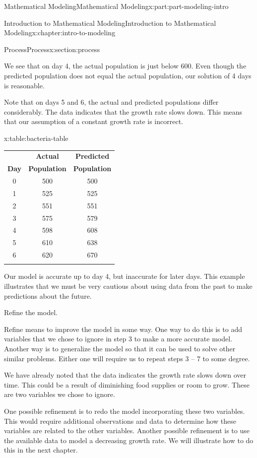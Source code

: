 \documentclass[oneside,10pt,]{book}
\newcommand{\tabularfont}{\relax}
\numberwithin{equation}{section}
\newcommand{\hrulethin}  {\noalign{\hrule height 0.04em}}
\newcommand{\hrulethick} {\noalign{\hrule height 0.11em}}
\begin{document}
\begin{partptx}{Mathematical Modeling}{}{Mathematical Modeling}{}{}{x:part:part-modeling-intro}
\begin{chapterptx}{Introduction to Mathematical Modeling}{}{Introduction to Mathematical Modeling}{}{}{x:chapter:intro-to-modeling}
\begin{sectionptx}{Process}{}{Process}{}{}{x:section:process}
\begin{description}
\par
We see that on day 4, the actual population is just below 600. Even though the predicted population does not equal the actual population, our solution of 4 days is reasonable.%
\par
Note that on days 5 and 6, the actual and predicted populations differ considerably. The data indicates that the growth rate slows down. This means that our assumption of a constant growth rate is incorrect.%
\par
\begin{tableptx}{\textbf{}}{x:table:bacteria-table}{}%
\centering%
{\tabularfont%
\begin{tabular}{ccc}\hrulethick
\textbf{}&\textbf{Actual}&\textbf{Predicted}\tabularnewline[0pt]
\textbf{Day}&\textbf{Population}&\textbf{Population}\tabularnewline\hrulethin
0&500&500\tabularnewline[0pt]
1&525&525\tabularnewline[0pt]
2&551&551\tabularnewline[0pt]
3&575&579\tabularnewline[0pt]
4&598&608\tabularnewline[0pt]
5&610&638\tabularnewline[0pt]
6&620&670\tabularnewline\hrulethick
\end{tabular}
}%
\end{tableptx}%
%
\par
Our model is accurate up to day 4, but inaccurate for later days. This example illustrates that we must be very cautious about using data from the past to make predictions about the future.%
\item[{Step 8:}]Refine the model.%
\par
Refine means to improve the model in some way. One way to do this is to add variables that we chose to ignore in step 3 to make a more accurate model. Another way is to generalize the model so that it can be used to solve other similar problems. Either one will require us to repeat steps 3 – 7 to some degree.%
\par
We have already noted that the data indicates the growth rate slows down over time. This could be a result of diminishing food supplies or room to grow. These are two variables we chose to ignore.%
\par
One possible refinement is to redo the model incorporating these two variables. This would require additional observations and data to determine how these variables are related to the other variables. Another possible refinement is to use the available data to model a decreasing growth rate. We will illustrate how to do this in the next chapter.%
\par

\end{description}
\end{sectionptx}
\end{chapterptx}
\end{partptx}
\end{document}
